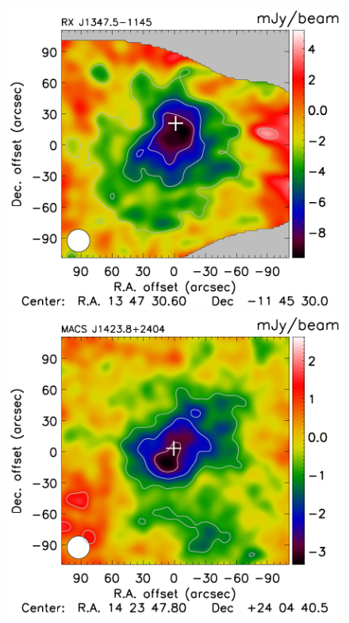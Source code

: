 \documentclass[twocolumn,traditabstract]{aa}
\begin{document}
\begin{figure}[h]
\centering
\includegraphics[trim=0cm 0cm 0cm 0cm, clip=true, totalheight=5.4cm]{Figure/Map_RXJ1347.pdf}
\includegraphics[trim=0cm 0cm 0cm 0cm, clip=true, totalheight=5.4cm]{Figure/Map_MACSJ1424.pdf}

\end{figure}
\end{document}
